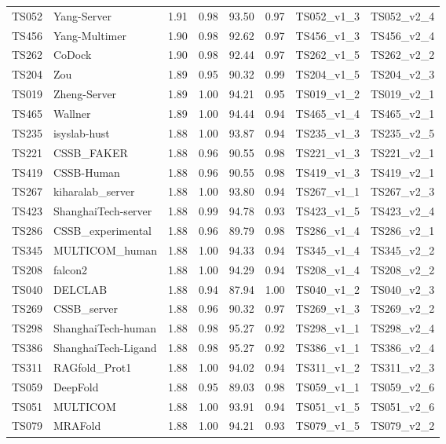 \begin{longtable}{llllllll}
TS052 & Yang-Server & 1.91 & 0.98 & 93.50 & 0.97 & TS052\_v1\_3 & TS052\_v2\_4 \\ 
TS456 & Yang-Multimer & 1.90 & 0.98 & 92.62 & 0.97 & TS456\_v1\_3 & TS456\_v2\_4 \\ 
TS262 & CoDock & 1.90 & 0.98 & 92.44 & 0.97 & TS262\_v1\_5 & TS262\_v2\_2 \\ 
TS204 & Zou & 1.89 & 0.95 & 90.32 & 0.99 & TS204\_v1\_5 & TS204\_v2\_3 \\ 
TS019 & Zheng-Server & 1.89 & 1.00 & 94.21 & 0.95 & TS019\_v1\_2 & TS019\_v2\_1 \\ 
TS465 & Wallner & 1.89 & 1.00 & 94.44 & 0.94 & TS465\_v1\_4 & TS465\_v2\_1 \\ 
TS235 & isyslab-hust & 1.88 & 1.00 & 93.87 & 0.94 & TS235\_v1\_3 & TS235\_v2\_5 \\ 
TS221 & CSSB\_FAKER & 1.88 & 0.96 & 90.55 & 0.98 & TS221\_v1\_3 & TS221\_v2\_1 \\ 
TS419 & CSSB-Human & 1.88 & 0.96 & 90.55 & 0.98 & TS419\_v1\_3 & TS419\_v2\_1 \\ 
TS267 & kiharalab\_server & 1.88 & 1.00 & 93.80 & 0.94 & TS267\_v1\_1 & TS267\_v2\_3 \\ 
TS423 & ShanghaiTech-server & 1.88 & 0.99 & 94.78 & 0.93 & TS423\_v1\_5 & TS423\_v2\_4 \\ 
TS286 & CSSB\_experimental & 1.88 & 0.96 & 89.79 & 0.98 & TS286\_v1\_4 & TS286\_v2\_1 \\ 
TS345 & MULTICOM\_human & 1.88 & 1.00 & 94.33 & 0.94 & TS345\_v1\_4 & TS345\_v2\_2 \\ 
TS208 & falcon2 & 1.88 & 1.00 & 94.29 & 0.94 & TS208\_v1\_4 & TS208\_v2\_2 \\ 
TS040 & DELCLAB & 1.88 & 0.94 & 87.94 & 1.00 & TS040\_v1\_2 & TS040\_v2\_3 \\ 
TS269 & CSSB\_server & 1.88 & 0.96 & 90.32 & 0.97 & TS269\_v1\_3 & TS269\_v2\_2 \\ 
TS298 & ShanghaiTech-human & 1.88 & 0.98 & 95.27 & 0.92 & TS298\_v1\_1 & TS298\_v2\_4 \\ 
TS386 & ShanghaiTech-Ligand & 1.88 & 0.98 & 95.27 & 0.92 & TS386\_v1\_1 & TS386\_v2\_4 \\ 
TS311 & RAGfold\_Prot1 & 1.88 & 1.00 & 94.02 & 0.94 & TS311\_v1\_2 & TS311\_v2\_3 \\ 
TS059 & DeepFold & 1.88 & 0.95 & 89.03 & 0.98 & TS059\_v1\_1 & TS059\_v2\_6 \\ 
TS051 & MULTICOM & 1.88 & 1.00 & 93.91 & 0.94 & TS051\_v1\_5 & TS051\_v2\_6 \\ 
TS079 & MRAFold & 1.88 & 1.00 & 94.21 & 0.93 & TS079\_v1\_5 & TS079\_v2\_2 \\ 

\end{longtable}
